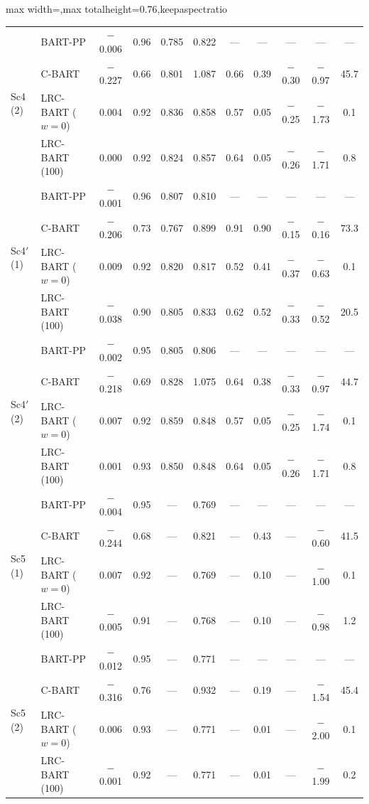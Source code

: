 \documentclass[11pt]{article}
\theoremstyle{definition}
\theoremstyle{plain}
\begin{document}
{\begin{table}[htbp]
{\begin{adjustbox}{max width=\textwidth,max totalheight=0.76\textheight,keepaspectratio}
\begin{tabular}{llccccccccc}
\midrule
\multirow{4}{*}{Sc4 (2)} & BART-PP & $-$0.006 & 0.96 & 0.785 & 0.822 & --- & --- & --- & --- & --- \\
& C-BART & $-$0.227 & 0.66 & 0.801 & 1.087 & 0.66 & 0.39 & $-$0.30 & $-$0.97 & 45.7 \\
& LRC-BART ($w=0$) & 0.004 & 0.92 & 0.836 & 0.858 & 0.57 & 0.05 & $-$0.25 & $-$1.73 & 0.1 \\
& LRC-BART (100) & 0.000 & 0.92 & 0.824 & 0.857 & 0.64 & 0.05 & $-$0.26 & $-$1.71 & 0.8 \\
\midrule
\multirow{4}{*}{Sc4$'$ (1)} & BART-PP & $-$0.001 & 0.96 & 0.807 & 0.810 & --- & --- & --- & --- & --- \\
& C-BART & $-$0.206 & 0.73 & 0.767 & 0.899 & 0.91 & 0.90 & $-$0.15 & $-$0.16 & 73.3 \\
& LRC-BART ($w=0$) & 0.009 & 0.92 & 0.820 & 0.817 & 0.52 & 0.41 & $-$0.37 & $-$0.63 & 0.1 \\
& LRC-BART (100) & $-$0.038 & 0.90 & 0.805 & 0.833 & 0.62 & 0.52 & $-$0.33 & $-$0.52 & 20.5 \\
\midrule
\multirow{4}{*}{Sc4$'$ (2)} & BART-PP & $-$0.002 & 0.95 & 0.805 & 0.806 & --- & --- & --- & --- & --- \\
& C-BART & $-$0.218 & 0.69 & 0.828 & 1.075 & 0.64 & 0.38 & $-$0.33 & $-$0.97 & 44.7 \\
& LRC-BART ($w=0$) & 0.007 & 0.92 & 0.859 & 0.848 & 0.57 & 0.05 & $-$0.25 & $-$1.74 & 0.1 \\
& LRC-BART (100) & 0.001 & 0.93 & 0.850 & 0.848 & 0.64 & 0.05 & $-$0.26 & $-$1.71 & 0.8 \\
\midrule
\multirow{4}{*}{Sc5 (1)} & BART-PP & $-$0.004 & 0.95 & --- & 0.769 & --- & --- & --- & --- & --- \\
& C-BART & $-$0.244 & 0.68 & --- & 0.821 & --- & 0.43 & --- & $-$0.60 & 41.5 \\
& LRC-BART ($w=0$) & 0.007 & 0.92 & --- & 0.769 & --- & 0.10 & --- & $-$1.00 & 0.1 \\
& LRC-BART (100) & $-$0.005 & 0.91 & --- & 0.768 & --- & 0.10 & --- & $-$0.98 & 1.2 \\
\midrule
\multirow{4}{*}{Sc5 (2)} & BART-PP & $-$0.012 & 0.95 & --- & 0.771 & --- & --- & --- & --- & --- \\
& C-BART & $-$0.316 & 0.76 & --- & 0.932 & --- & 0.19 & --- & $-$1.54 & 45.4 \\
& LRC-BART ($w=0$) & 0.006 & 0.93 & --- & 0.771 & --- & 0.01 & --- & $-$2.00 & 0.1 \\
& LRC-BART (100) & $-$0.001 & 0.92 & --- & 0.771 & --- & 0.01 & --- & $-$1.99 & 0.2 \\
\bottomrule
\end{tabular}
\end{adjustbox}
}
\end{table}

\clearpage}
\end{document}
